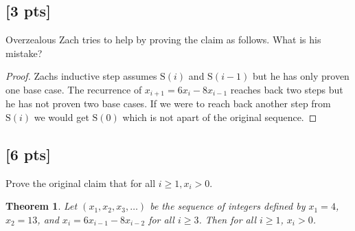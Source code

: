 \documentclass[11pt]{article}
\newtheorem{theorem}{Theorem}
\theoremstyle{definition}
\begin{document}
\vspace{1cm}

\subsection{[3 pts]} Overzealous Zach tries to help by proving the claim as follows. What is his mistake?
\begin{proof}
	Zachs inductive step assumes $\text{S}(i)$ and $\text{S}(i-1)$ but he has only proven one base case.
	The recurrence of $x_{i+1} = 6x_{i} - 8x_{i-1}$ reaches back two steps but he has not proven two base cases.
	If we were to reach back another step from $\text{S}(i)$ we would get $\text{S}(0)$ which is not apart of the original
	sequence.
\end{proof}

\vspace{1cm}


\subsection{[6 pts]} Prove the original claim that for all $i \geq 1, x_i > 0$.

\begin{theorem}
	Let $(x_1, x_2, x_3, \ldots)$ be the sequence of integers defined by $x_1 = 4$, $x_2 = 13$, and
	$x_i = 6 x_{i-1} - 8 x_{i-2}$ for all $i \geq 3$. Then for all $i \geq 1$, $x_i > 0$.
\end{theorem}
\end{document}
